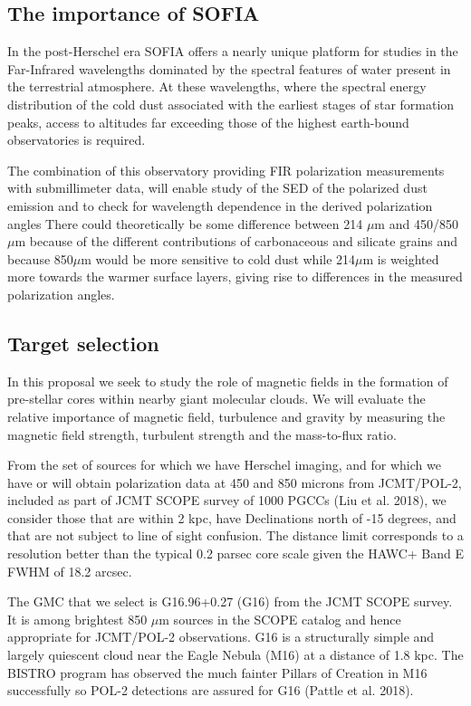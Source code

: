 \documentclass[11pt]{amsart}
\begin{document}
{\subsection{The importance of SOFIA}

In the post-Herschel era SOFIA offers a nearly unique platform for studies in the Far-Infrared
wavelengths dominated by the spectral features of water present in the terrestrial atmosphere.
At these wavelengths, where the spectral energy distribution of the cold dust associated 
with the earliest stages of star formation peaks, access to altitudes far exceeding those of the
highest earth-bound observatories is required. 


The combination of this observatory providing FIR polarization measurements
with submillimeter data, will enable study of the SED of the polarized dust emission and to check for wavelength dependence in the derived polarization angles
There could theoretically be some difference between 214 $\mu$m and 450/850 $\mu$m because of the different contributions of carbonaceous and silicate grains  and because 850$\mu$m would be more sensitive to cold dust while 214$\mu$m is weighted more towards the warmer surface layers, giving rise to differences in the measured polarization angles.

 
\subsection{Target selection}

In this proposal we seek to study the role of magnetic fields in the formation of pre-stellar cores within 
nearby giant molecular clouds.
We will evaluate the relative importance of magnetic field, turbulence and gravity by measuring the magnetic field strength, turbulent strength and the mass-to-flux ratio.

From the set of sources for which we have Herschel imaging, and for which we have or will obtain polarization data at  450 and 850 microns from JCMT/POL-2, included as part of JCMT SCOPE survey of 1000 PGCCs (Liu et al. 2018), we consider those that are within 2 kpc, have Declinations north of -15 degrees, and that are not subject to line of sight confusion. The distance limit corresponds to a resolution better than the typical 0.2 parsec core scale given the HAWC+ Band E FWHM of 18.2 arcsec. 

The GMC that we select is G16.96+0.27 (G16) from the JCMT SCOPE survey. It is among brightest 850 $\mu$m sources in the SCOPE catalog and hence appropriate for JCMT/POL-2 observations. G16 is a structurally simple and largely quiescent cloud near the Eagle Nebula (M16) at a distance of 1.8 kpc. 
The BISTRO program has observed the much fainter Pillars of Creation in M16 successfully so POL-2 detections are assured for G16 (Pattle et al. 2018).

}
\end{document}
